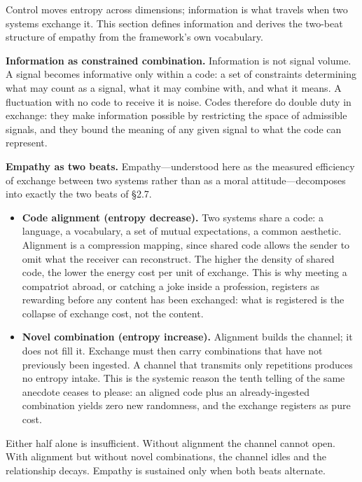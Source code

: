 \documentclass[11pt,a4paper]{article}
\begin{document}
Control moves entropy across dimensions; information is what travels when two systems exchange it. This section defines information and derives the two-beat structure of empathy from the framework's own vocabulary.

\textbf{Information as constrained combination.} Information is not signal volume. A signal becomes informative only within a code: a set of constraints determining what may count as a signal, what it may combine with, and what it means. A fluctuation with no code to receive it is noise. Codes therefore do double duty in exchange: they make information possible by restricting the space of admissible signals, and they bound the meaning of any given signal to what the code can represent.

\textbf{Empathy as two beats.} Empathy---understood here as the measured efficiency of exchange between two systems rather than as a moral attitude---decomposes into exactly the two beats of \S2.7.

\begin{itemize}
    \item \textbf{Code alignment (entropy decrease).} Two systems share a code: a language, a vocabulary, a set of mutual expectations, a common aesthetic. Alignment is a compression mapping, since shared code allows the sender to omit what the receiver can reconstruct. The higher the density of shared code, the lower the energy cost per unit of exchange. This is why meeting a compatriot abroad, or catching a joke inside a profession, registers as rewarding before any content has been exchanged: what is registered is the collapse of exchange cost, not the content.
    \item \textbf{Novel combination (entropy increase).} Alignment builds the channel; it does not fill it. Exchange must then carry combinations that have not previously been ingested. A channel that transmits only repetitions produces no entropy intake. This is the systemic reason the tenth telling of the same anecdote ceases to please: an aligned code plus an already-ingested combination yields zero new randomness, and the exchange registers as pure cost.
\end{itemize}

Either half alone is insufficient. Without alignment the channel cannot open. With alignment but without novel combinations, the channel idles and the relationship decays. Empathy is sustained only when both beats alternate.
\end{document}
